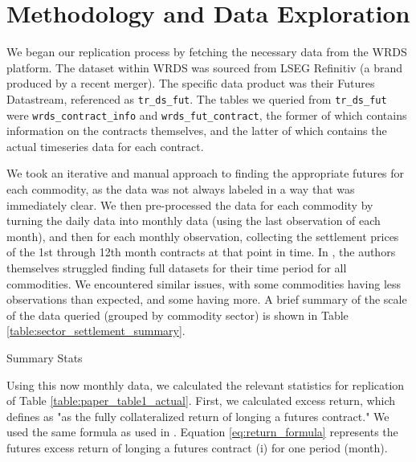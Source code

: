 \documentclass[12pt]{article}
\begin{document}
\newpage

\newpage
\section{Methodology and Data Exploration}

We began our replication process by fetching the necessary data from the WRDS platform.
The dataset within WRDS was sourced from LSEG Refinitiv (a brand produced by a recent merger).
The specific data product was their Futures Datastream, referenced as \texttt{tr\_ds\_fut}.
The tables we queried from \texttt{tr\_ds\_fut} were \texttt{wrds\_contract\_info} and \texttt{wrds\_fut\_contract}, the former of which contains information on the contracts themselves, and the latter of which contains the actual timeseries data for each contract.

We took an iterative and manual approach to finding the appropriate futures for each commodity, as the data was not always labeled in a way that was immediately clear.
We then pre-processed the data for each commodity by turning the daily data into monthly data (using the last observation of each month), and then for each monthly observation, collecting the settlement prices of the 1st through 12th month contracts at that point in time.
In \cite{Yang2013}, the authors themselves struggled finding full datasets for their time period for all commodities.
We encountered similar issues, with some commodities having less observations than expected, and some having more.
A brief summary of the scale of the data queried (grouped by commodity sector) is shown in Table \ref{table:sector_settlement_summary}.

\begin{table}[ht!]
    \caption{Summary Stats}
    \centering
    \renewcommand{\arraystretch}{1.2}  
    \setlength{\tabcolsep}{5pt}        
    \begin{adjustbox}{max width=\textwidth}
    
    \end{adjustbox}
    \label{table:sector_settlement_summary}
\end{table}

Using this now monthly data, we calculated the relevant statistics for replication of Table \ref{table:paper_table1_actual}.
First, we calculated excess return, which \cite{Yang2013} defines as "as the fully collateralized return of longing a futures contract."
We used the same formula as used in \cite{Yang2013}. Equation \ref{eq:return_formula} represents the futures excess return of longing a futures contract (i) for one period (month).
\end{document}

